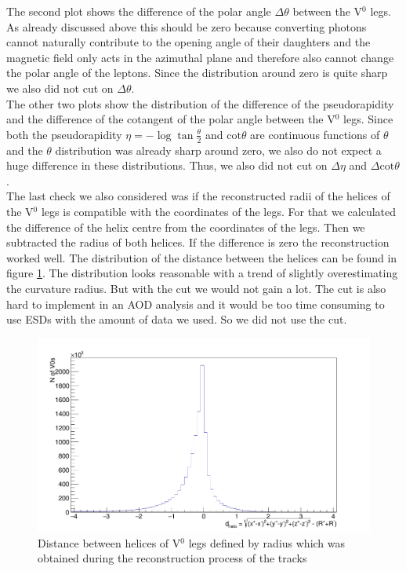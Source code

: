The second plot shows the difference of the polar angle $\Delta\theta$ between the V$^0$ legs. As already discussed above this should be zero because converting photons cannot naturally contribute to the opening angle of their daughters and the magnetic field only acts in the azimuthal plane and therefore also cannot change the polar angle of the leptons. Since the distribution around zero is quite sharp we also did not cut on $\Delta\theta$. \\
The other two plots show the distribution of the difference of the pseudorapidity and the difference of the cotangent of the polar angle between the V$^0$ legs. Since both the pseudorapidity $\eta = -\log\tan\frac{\theta}{2}$ and $\mathrm{cot}\theta$ are continuous functions of $\theta$ and the $\theta$ distribution was already sharp around zero, we also do not expect a huge difference in these distributions. Thus, we also did not cut on $\Delta\eta$ and $\Delta\mathrm{cot}\theta$. \\
The last check we also considered was if the reconstructed radii of the helices of the V$^0$ legs is compatible with the coordinates of the legs. For that we calculated the difference of the helix centre from the coordinates of the legs. Then we subtracted the radius of both helices. If the difference is zero the reconstruction worked well. The distribution of the distance between the helices can be found in figure \ref{fig:helixdist}. The distribution looks reasonable with a trend of slightly overestimating the curvature radius. But with the cut we would not gain a lot. The cut is also hard to implement in an AOD analysis and it would be too time consuming to use ESDs with the amount of data we used. So we did not use the cut. \\
\begin{figure}[t]
	\centering
	\includegraphics[width=0.8\linewidth]{Figures/additionalV0cuts/helixdist.png}
	\caption{Distance between helices of V$^0$ legs defined by radius which was obtained during the reconstruction process of the tracks}
	\label{fig:helixdist}
\end{figure}


